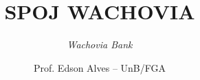 \title{SPOJ WACHOVIA}
\subtitle{\textit{Wachovia Bank}}
\author{Prof. Edson Alves -- UnB/FGA}
\date{}
